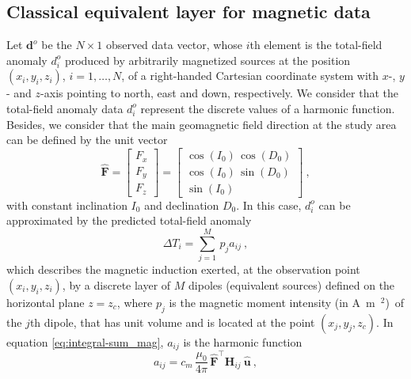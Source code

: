 \documentclass[manuscript]{geophysics}
\begin{document}
	\subsection{Classical equivalent layer for magnetic data}
	
	Let $\mathbf{d}^{o}$ be the $N \times 1$ observed data vector, whose $i$th element 
	is the total-field anomaly $d^{o}_{i}$ produced by arbitrarily magnetized sources
	at the position $(x_{i}, y_{i}, z_{i})$, $i =  1, \dots, N $, 
	of a right-handed Cartesian coordinate system with $x$-, $y$- and $z$-axis 
	pointing to north, east and down, respectively.
	We consider that the total-field anomaly data $d^{o}_{i}$ represent the discrete
	values of a harmonic function. Besides, we consider that the main geomagnetic field 
	direction at the study area can be defined by the unit vector
	\begin{equation}
		\hat{\mathbf{F}} = \begin{bmatrix}
			F_x \\
			F_y \\
			F_z
		\end{bmatrix} =
		\begin{bmatrix}
			\cos(I_{0}) \, \cos(D_{0}) \\
			\cos(I_{0}) \, \sin(D_{0}) \\
			\sin(I_{0})
		\end{bmatrix} \: ,
		\label{eq:unit_vector_F}
	\end{equation}
	with constant inclination $I_{0}$ and declination $D_{0}$.
	In this case, $d^{o}_{i}$ can be approximated by the predicted total-field anomaly
	\begin{equation}
		\Delta T_{i} = \sum_{j=1}^{M} \, p_{j} a_{ij} \: ,
		\label{eq:integral-sum_mag}
	\end{equation}
	which describes the magnetic induction exerted, at the observation point $(x_{i}, y_{i}, z_{i})$,
	by a discrete layer of $M$ dipoles (equivalent sources) defined on the horizontal plane $z = z_{c}$, 
	where $p_{j}$ is the magnetic moment intensity (in A~m~$^{2}$)~of the $j$th dipole, 
	that has unit volume and is located at the point $(x_{j}, y_{j}, z_{c})$. In equation
	\ref{eq:integral-sum_mag}, $a_{ij}$ is the harmonic function
	\begin{equation}
		a_{ij}
		= c_{m} \, \frac{\mu_{0}}{4\pi} \, \hat{\mathbf{F}}^{\top} \mathbf{H}_{ij} \: \hat{\mathbf{u}} \: ,
		\label{eq:aij_mag}
	\end{equation}
\end{document}
